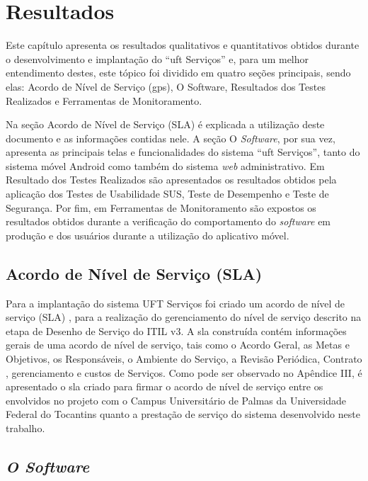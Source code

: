 \chapter{Resultados}

\noindent Este capítulo apresenta os resultados qualitativos e quantitativos obtidos durante o desenvolvimento e implantação do ``\acrshort{uft} Serviços'' e, para um melhor entendimento destes, este tópico foi dividido em quatro seções principais, sendo elas: Acordo de Nível de Serviço (\acrshort{gps}), O Software, Resultados dos Testes Realizados e Ferramentas de Monitoramento.

Na seção Acordo de Nível de Serviço (SLA) é explicada a utilização deste documento e as informações contidas nele. A seção O \textit{Software}, por sua vez, apresenta as principais telas e funcionalidades do sistema ``\acrshort{uft} Serviços'', tanto do sistema móvel Android como também do sistema \textit{web} administrativo. Em Resultado dos Testes Realizados são apresentados os resultados obtidos pela aplicação dos Testes de Usabilidade SUS, Teste de Desempenho e Teste de Segurança. Por fim, em Ferramentas de Monitoramento são expostos os resultados obtidos durante a verificação do comportamento do \textit{software} em produção e dos usuários durante a utilização do aplicativo móvel.

\section{Acordo de Nível de Serviço (SLA)}

\noindent Para a implantação do sistema UFT Serviços foi criado um acordo de nível de serviço (SLA) , para a realização do gerenciamento do nível de serviço descrito na etapa de Desenho de Serviço do ITIL v3. A \acrshort{sla} construída contém informações gerais de uma acordo de nível de serviço, tais como o Acordo Geral, as Metas e Objetivos, os Responsáveis, o Ambiente do Serviço, a Revisão Periódica, Contrato , gerenciamento e custos de Serviços. Como pode ser observado no Apêndice III, é apresentado o \acrshort{sla} criado para firmar o acordo de nível de serviço entre os envolvidos no projeto com o Campus Universitário de Palmas da Universidade Federal do Tocantins quanto a prestação de serviço do sistema desenvolvido neste trabalho.

\section{\textit{O Software}}

